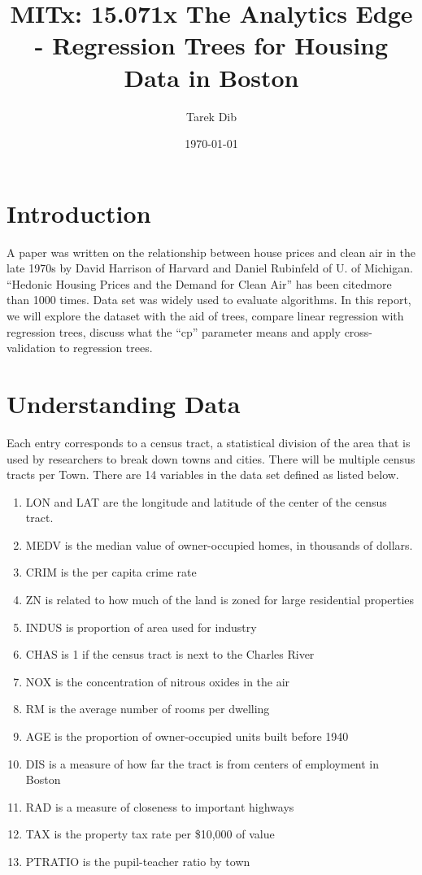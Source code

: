 \documentclass[11pt, a4paper]{article}\usepackage[]{graphicx}\usepackage[]{color}
\title{MITx: 15.071x The Analytics Edge - Regression Trees for Housing Data in Boston}
\author{Tarek Dib}
\date{\today}
\begin{document}
\maketitle
\section{Introduction}
A paper was written on the relationship between house prices and clean air in the late 1970s by David Harrison of Harvard and Daniel Rubinfeld of U. of Michigan. “Hedonic Housing Prices and the Demand for Clean Air” has been citedmore than 1000 times. Data set was widely used to evaluate algorithms. In this report, we will explore the dataset with the aid of trees, compare linear regression with regression trees, discuss what the “cp” parameter means and apply cross-validation to regression trees.

\section{Understanding Data}
Each entry corresponds to a census tract, a statistical division of the area that is used by researchers to break down towns and cities. There will be multiple census tracts per Town. There are 14 variables in the data set defined as listed below.
\\
\begin{enumerate}
\item LON and LAT are the longitude and latitude of the center of the census tract.
\item MEDV is the median value of owner-occupied homes, in thousands of dollars.
\item CRIM is the per capita crime rate
\item ZN is related to how much of the land is zoned for large residential properties
\item INDUS is proportion of area used for industry
\item CHAS is 1 if the census tract is next to the Charles River
\item NOX is the concentration of nitrous oxides in the air
\item RM is the average number of rooms per dwelling
\item AGE is the proportion of owner-occupied units built before 1940
\item DIS is a measure of how far the tract is from centers of employment in Boston
\item RAD is a measure of closeness to important highways
\item TAX is the property tax rate per \$10,000 of value
\item PTRATIO is the pupil-teacher ratio by town
\end{enumerate}
\end{document}
